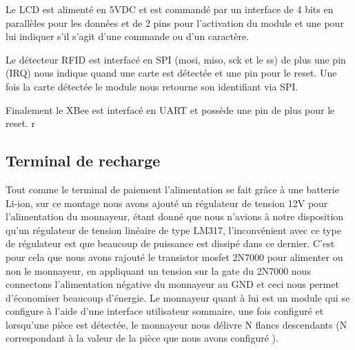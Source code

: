	Le LCD est alimenté en 5VDC et est commandé par un interface de 4 bits en parallèles pour les données et de 2 pins pour l’activation du module et une pour lui indiquer s’il s’agit d’une commande ou d’un caractère. 

	Le détecteur RFID est interfacé en SPI (mosi, miso, sck et le ss) de plus une pin (IRQ) nous indique quand une carte est détectée et une pin pour le reset. Une fois la carte détectée le module nous retourne son identifiant via SPI.

	Finalement le XBee est interfacé en UART et possède une pin de plus pour le reset.
r	
	\subsection{Terminal de recharge}
	Tout comme le terminal de paiement l’alimentation se fait grâce à une batterie Li-ion, sur ce montage nous avons ajouté un régulateur de tension 12V pour l’alimentation du monnayeur, étant donné que nous n’avions à notre disposition qu’un régulateur de tension linéaire de type LM317, l'inconvénient avec ce type de régulateur est que beaucoup de puissance est dissipé dans ce dernier. C’est pour cela que nous avons rajouté le transistor mosfet 2N7000 pour alimenter ou non le monnayeur, en appliquant un tension sur la gate du 2N7000 nous connectons l’alimentation négative du monnayeur au GND et ceci nous permet d'économiser beaucoup d’énergie. Le monnayeur quant à lui est un module qui se configure à l’aide d’une interface utilisateur sommaire, une fois configuré et lorsqu’une pièce est détectée, le monnayeur nous délivre N  flancs descendants (N correspondant à la valeur de la pièce que nous avons configuré ).

	
	